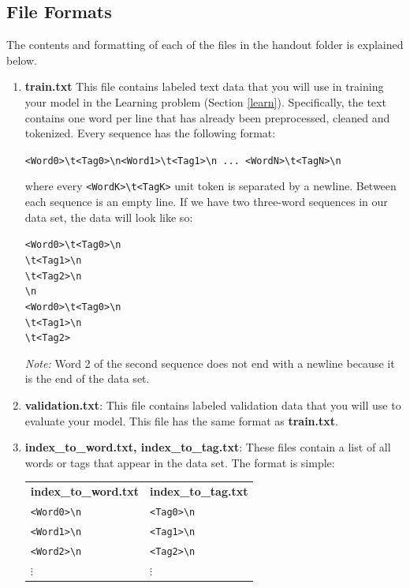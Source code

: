 \documentclass[11pt,addpoints,answers]{exam}
\begin{document}
\subsection{File Formats}\label{formats}
The contents and formatting of each of the files in the handout folder is explained below. 
\begin{enumerate}

\item \textbf{train.txt} This file contains labeled text data that you will use in training your model in the Learning problem (Section \ref{learn}). Specifically, the text contains one word per line that has already been preprocessed, cleaned and tokenized. Every sequence has the following format:

    \texttt{<Word0>\textbackslash t<Tag0>\textbackslash n<Word1>\textbackslash t<Tag1>\textbackslash n ... <WordN>\textbackslash t<TagN>\textbackslash n}

where every \texttt{<WordK>\textbackslash t<TagK>} unit token is separated by a newline. Between each sequence is an empty line. If we have two three-word sequences in our data set, the data will look like so:

    \texttt{<Word0>\textbackslash t<Tag0>\textbackslash n\\<Word1>\textbackslash t<Tag1>\textbackslash n\\<Word2>\textbackslash t<Tag2>\textbackslash n\\\textbackslash n\\}
    \texttt{<Word0>\textbackslash t<Tag0>\textbackslash n\\<Word1>\textbackslash t<Tag1>\textbackslash n\\<Word2>\textbackslash t<Tag2>}
    
\textit{Note:} Word 2 of the second sequence does not end with a newline because it is the end of the data set.

\item \textbf{validation.txt}: This file contains labeled validation data that you will use to evaluate your model. This file has the same format as \textbf{train.txt}.
    
\item \textbf{index\_to\_word.txt, index\_to\_tag.txt}: These files contain a list of all words or tags that appear in the data set. The format is simple:

\begin{tabular}{ m{5cm}  m{5cm} } 
    \textbf{index\_to\_word.txt} & \textbf{index\_to\_tag.txt} \\
    \texttt{<Word0>\textbackslash n} & \texttt{<Tag0>\textbackslash n} \\
    \texttt{<Word1>\textbackslash n} & \texttt{<Tag1>\textbackslash n} \\
    \texttt{<Word2>\textbackslash n} & \texttt{<Tag2>\textbackslash n} \\
    $\vdots$ & $\vdots$
\end{tabular}


\end{enumerate}
\end{document}
